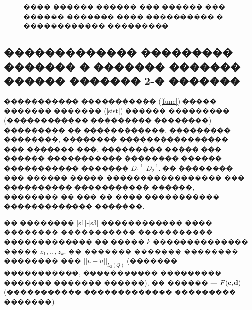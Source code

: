 \documentclass[a4paper]{article}
\begin{document}
\begin{figure}[h!]
  \caption{���� ������ ������ ��� ������ ��� ������ ������� ���� ���������� � ������������ ���������}
  \label{parab}
\end{figure}

\subsection{������������� ��������� ������� � ������� ������� ������ ������� 2-� �������}
����������� ����������� (\ref{func}) ����� ������� ������� (\ref{sist}) ������ ��������� (������������ ��������� ��������) ��������� �� ������������,
��������� ��������, �������� ���������������� ��� ������� ���, ��������� ����� ��� ������ ����������� �������� ������ ����������� ������� $D_1^{-1}, D_2^{-1}$.
�� �������� ��� ������ ����� ����������������� ��� ���������� ����������� ������, �������� �� ��� �� ���� ����������� ������������� �������.

�� �������� \ref{s1}-\ref{s3} ������������ ���� �������� ����������� ����������� ������������� �� ����� $k$ �������������� ����� $z_1,\dots, z_k$.
�� ������� ������� �������� �������� ��� $||u - \tilde{u} ||_{L_2(Q)}$ (������� �����������, ����������� ��������� ������� ������� ������), �� ������ --- $F({\bf c},{\bf d})$ (����������� ������������� ��������� �������).
\end{document}
